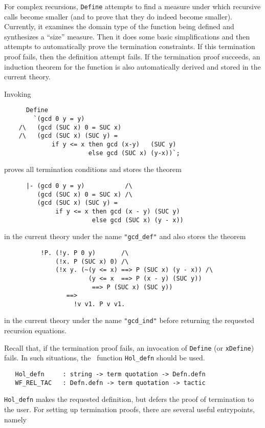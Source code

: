For complex recursions, {\small\verb+Define+} attempts to find a measure
under which recursive calls become smaller (and to prove that they do
indeed become smaller). Currently, it examines the domain type of the
function being defined and synthesizes a ``size'' measure.  Then it does
some basic simplifications and then attempts to automatically prove the
termination constraints.  If this termination proof fails, then the
definition attempt fails. If the termination proof succeeds, an
induction theorem for the function is also automatically derived and
stored in the current theory.

 Invoking
\begin{verbatim}
      Define
        `(gcd 0 y = y)
    /\   (gcd (SUC x) 0 = SUC x)
    /\   (gcd (SUC x) (SUC y) =
             if y <= x then gcd (x-y)   (SUC y)
                       else gcd (SUC x) (y-x))`;
\end{verbatim}
proves all termination conditions and stores the theorem
\begin{verbatim}
      |- (gcd 0 y = y)           /\
         (gcd (SUC x) 0 = SUC x) /\
         (gcd (SUC x) (SUC y) =
              if y <= x then gcd (x - y) (SUC y)
                        else gcd (SUC x) (y - x))
\end{verbatim}
\noindent in the current theory under the name \verb+"gcd_def"+ and
also stores the theorem
\begin{verbatim}
          !P. (!y. P 0 y)       /\
              (!x. P (SUC x) 0) /\
              (!x y. (~(y <= x) ==> P (SUC x) (y - x)) /\
                       (y <= x  ==> P (x - y) (SUC y))
                        ==> P (SUC x) (SUC y))
                 ==>
                   !v v1. P v v1.
\end{verbatim}
\noindent in the current theory under the name \verb+"gcd_ind"+ before
returning the requested recursion equations.

Recall that, if the termination proof fails, an invocation of
\verb+Define+  (or \verb+xDefine+) fails. In such situations, the \ML\
function \verb+Hol_defn+ should be used.

\begin{verbatim}
   Hol_defn     : string -> term quotation -> Defn.defn
   WF_REL_TAC   : Defn.defn -> term quotation -> tactic
\end{verbatim}

\verb+Hol_defn+ makes the requested definition, but defers the proof of
termination to the user. For setting up termination proofs, there are
several useful entrypoints, namely


